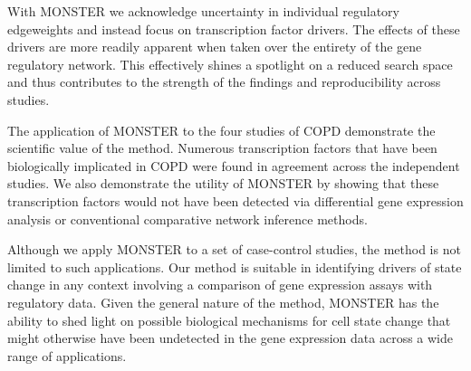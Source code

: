 \documentclass[9pt,twocolumn,twoside]{pnas-new}
\begin{document}
With MONSTER we acknowledge uncertainty in individual regulatory edgeweights
and instead focus on transcription factor drivers. The effects of
these drivers are more readily apparent when taken over the entirety
of the gene regulatory network. This effectively shines a spotlight
on a reduced search space and thus contributes to the strength of
the findings and reproducibility across studies.

The application of MONSTER to the four studies of COPD demonstrate
the scientific value of the method. Numerous transcription factors
that have been biologically implicated in COPD were found in agreement
across the independent studies. We also demonstrate the utility of
MONSTER by showing that these transcription factors would not have
been detected via differential gene expression analysis or conventional
comparative network inference methods.

Although we apply MONSTER to a set of case-control studies, the method
is not limited to such applications. Our method is suitable in identifying
drivers of state change in any context involving a comparison of gene
expression assays with regulatory data. Given the general nature of
the method, MONSTER has the ability to shed light on possible biological
mechanisms for cell state change that might otherwise have been undetected
in the gene expression data across a wide range of applications.


\showacknow %

\pnasbreak


\end{document}
